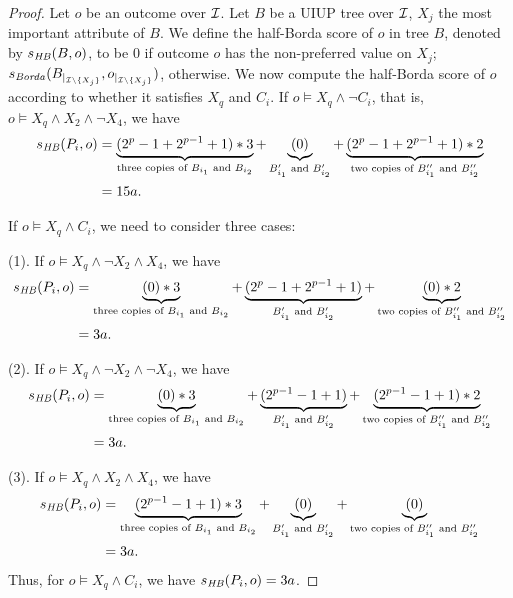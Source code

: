 \begin{proof}
Let $o$ be an outcome over $\mathcal{I}$. 
Let $B$ be a UIUP tree over $\mathcal{I}$, $X_j$ the most important attribute of $B$.
We define the half-Borda score of $o$ in tree $B$, denoted by $s_{\mathit{HB}}(B,o)$,
to be $0$ if outcome $o$ has the non-preferred value on $X_j$; 
$s_{\mathit{Borda}}(B_{|_{\mathcal{I}\backslash \{X_j\}}},o_{|_{\mathcal{I}\backslash \{X_j\}}})$, otherwise.
We now compute the half-Borda score of $o$ according to whether it satisfies
$X_q$ and $C_i$.
If $o \models X_q \land \neg C_i$, that is, $o \models X_q \land X_2 \land \neg X_4$, we have
\begin{align*}
	s_{\mathit{HB}}(P_i,o)&=\underbrace{(2^p-1+2^{p-1}+1)*3}_{\text{three copies of }B_{i_1}\text{ and }B_{i_2}}+
								  \underbrace{(0)}_{B'_{i_1}\text{ and }B'_{i_2}}+
									\underbrace{(2^p-1+2^{p-1}+1)*2}_{\text{two copies of }B''_{i_1}\text{ and }B''_{i_2}} \\
								&=15a.
\end{align*}

If $o \models X_q \land C_i$, we need to consider three cases:

(1). If $o \models X_q \land \neg X_2 \land X_4$, we have
\begin{align*}
	s_{\mathit{HB}}(P_i,o)&=\underbrace{(0)*3}_{\text{three copies of }B_{i_1}\text{ and }B_{i_2}}+
								  \underbrace{(2^p-1+2^{p-1}+1)}_{B'_{i_1}\text{ and }B'_{i_2}}+
									\underbrace{(0)*2}_{\text{two copies of }B''_{i_1}\text{ and }B''_{i_2}} \\
								&=3a.
\end{align*}

(2). If $o \models X_q \land \neg X_2 \land \neg X_4$, we have
\begin{align*}
	s_{\mathit{HB}}(P_i,o)&=\underbrace{(0)*3}_{\text{three copies of }B_{i_1}\text{ and }B_{i_2}}+
								  \underbrace{(2^{p-1}-1+1)}_{B'_{i_1}\text{ and }B'_{i_2}}+
									\underbrace{(2^{p-1}-1+1)*2}_{\text{two copies of }B''_{i_1}\text{ and }B''_{i_2}} \\
								&=3a.
\end{align*}

(3). If $o \models X_q \land X_2 \land X_4$, we have
\begin{align*}
	s_{\mathit{HB}}(P_i,o)&=\underbrace{(2^{p-1}-1+1)*3}_{\text{three copies of }B_{i_1}\text{ and }B_{i_2}}+
								  \underbrace{(0)}_{B'_{i_1}\text{ and }B'_{i_2}}+
									\underbrace{(0)}_{\text{two copies of }B''_{i_1}\text{ and }B''_{i_2}} \\
								&=3a.
\end{align*}
Thus, for $o \models X_q \land C_i$, we have $s_{\mathit{HB}}(P_i,o)=3a$.


\end{proof}
